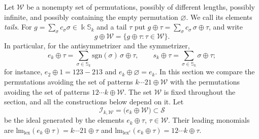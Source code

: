 \documentclass[11pt]{amsart}
\theoremstyle{definition}
\theoremstyle{remark}
\newcommand{\bS}{\mathbb{S}}
\newcommand{\kk}{\Bbbk}
\newcommand{\lm}{\mathrm{lm}}
\newcommand{\sgn}{\mathrm{sgn}}
\newcommand{\cI}{\mathscr{I}}
\newcommand{\cS}{\mathscr{S}}
\newcommand{\cW}{\mathcal{W}}
\newcommand{\lex}{\mathrm{lex}}
\begin{document}
Let $\cW$ be a nonempty set of permutations, possibly of different lengths, possibly infinite, and possibly containing the empty permutation $\varnothing$. We call its elements \emph{tails}. For $g=\sum_\sigma c_\sigma\sigma\in\kk\bS_k$ and a tail $\tau$ put $g\oplus\tau=\sum_\sigma c_\sigma\,\sigma\oplus\tau$, and write
\[
g\oplus\cW=\{g\oplus\tau:\tau\in\cW\}.
\]
In particular, for the antisymmetrizer and the symmetrizer,
\[
e_k\oplus\tau=\sum_{\sigma\in\bS_k}\sgn(\sigma)\,\sigma\oplus\tau,\qquad s_k\oplus\tau=\sum_{\sigma\in\bS_k}\sigma\oplus\tau;
\]
for instance, $e_2\oplus1=123-213$ and $e_k\oplus\varnothing=e_k$. In this section we compare the permutations avoiding the set of patterns $k\cdots21\oplus\cW$ with the permutations avoiding the set of patterns $12\cdots k\oplus\cW$. The set $\cW$ is fixed throughout the section, and all the constructions below depend on it. Let
\[
\cI_{k,\cW}=\bigl(e_k\oplus\cW\bigr)\subset\cS
\]
be the ideal generated by the elements $e_k\oplus\tau$, $\tau\in\cW$. Their leading monomials are $\lm_\lex(e_k\oplus\tau)=k\cdots21\oplus\tau$ and $\lm_{\lex^c}(e_k\oplus\tau)=12\cdots k\oplus\tau$.
\end{document}
